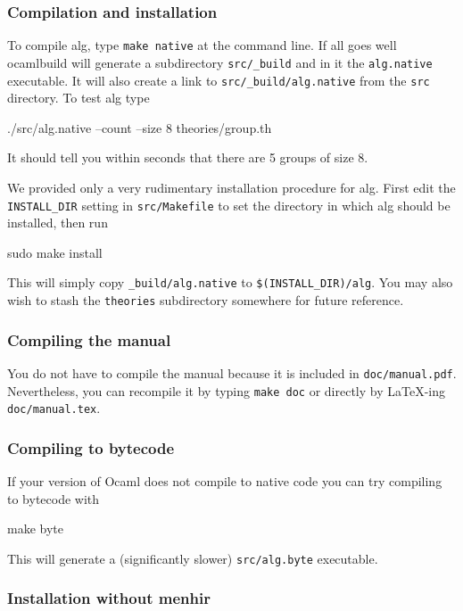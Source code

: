 \documentclass{article}
\begin{document}
\subsubsection{Compilation and installation}

To compile alg, type \texttt{make native} at the command line. If all goes well
ocamlbuild will generate a subdirectory \texttt{src/\_build} and in it the
\texttt{alg.native} executable. It will also create a link to
\texttt{src/\_build/alg.native} from the \texttt{src} directory. To test alg type
%
\begin{shell}
./src/alg.native --count --size 8 theories/group.th
\end{shell}
%
It should tell you within seconds that there are 5 groups of size 8. 

We provided only a very rudimentary installation procedure for alg.
First edit the \texttt{INSTALL\_DIR} setting in \texttt{src/Makefile} to
set the directory in which alg should be installed, then run
%
\begin{shell}
sudo make install
\end{shell}
%
This will simply copy \texttt{\_build/alg.native} to
\texttt{\$(INSTALL\_DIR)/alg}. You may also wish to stash the
\texttt{theories} subdirectory somewhere for future reference.

\subsubsection{Compiling the manual}
\label{sec:compiling-manual}

You do not have to compile the manual because it is included in
\texttt{doc/manual.pdf}. Nevertheless, you can recompile it by typing
\texttt{make doc} or directly by {\LaTeX}-ing \texttt{doc/manual.tex}.

\subsubsection{Compiling to bytecode}

If your version of Ocaml does not compile to native code you can try
compiling to bytecode with
%
\begin{shell}
make byte
\end{shell}
%
This will generate a (significantly slower) \texttt{src/alg.byte} executable.

\subsubsection{Installation without menhir}
\label{sec:nomenhir}
\end{document}
